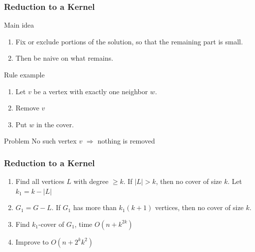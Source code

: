 \documentclass[12pt,aspectratio=169]{beamer}
\begin{document}
\begin{frame}\frametitle{Reduction to a Kernel}
\begin{block}{Main idea}
\begin{enumerate}
    \item
      Fix or exclude portions of the solution, so that the remaining part is small.
\item
    Then be naive on what remains.
\end{enumerate}
\end{block}

 \begin{block}{Rule example}
 \begin{enumerate}
  \item
    Let $v$ be a vertex with exactly one neighbor $w$.
  \item
     Remove $v$
 \item
     Put $w$ in the cover.
  \end{enumerate}
  \end{block}
  \begin{block}{Problem}
  No such vertex $v$  $\Rightarrow$ nothing is removed
  \end{block}
  \end{frame}


\begin{frame}\frametitle{Reduction to a Kernel}
  \begin{enumerate}
  \item
    Find all vertices $L$ with degree $\ge k$.
%
    If $|L|>k$, then no cover of size $k$.
%
    Let $k_{1} = k - |L|$
  \item
    $G_{1} = G - L$.
%
    If $G_{1}$ has more than $k_{1}(k+1)$ vertices, then no cover of size $k$.
  \item
    Find  $k_{1}$-cover of $G_{1}$, time $O(n + k^{2k})$
  \item
    Improve to $O(n + 2^{k}k^{2})$
  \end{enumerate}
\end{frame}
\end{document}
